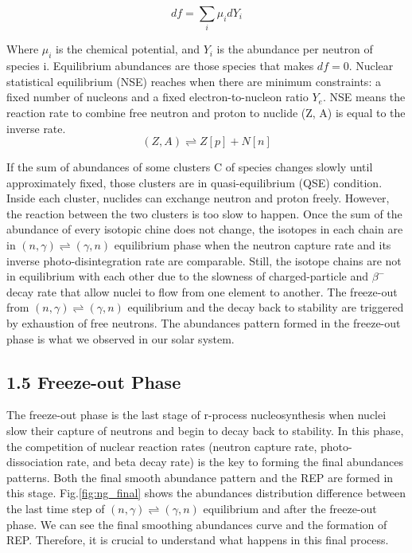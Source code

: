 \documentclass[aps,prl,preprint,groupedaddress]{revtex4}
\begin{document}
\begin{equation}
df = \sum_{i} \mu_idY_i
\end{equation}

Where $\mu_i$ is the chemical potential, and $Y_i$ is the abundance per neutron of species i. Equilibrium abundances are those species that makes $df = 0$. Nuclear statistical equilibrium (NSE) reaches when there are minimum constraints: a fixed number of nucleons and a fixed electron-to-nucleon ratio $Y_e$. NSE means the reaction rate to combine free neutron and proton to nuclide (Z, A) is equal to the inverse rate. 
\begin{equation}
    (Z,A) \rightleftharpoons Z[p] + N[n]
\end{equation}

If the sum of abundances of some clusters C of species changes slowly until approximately fixed, those clusters are in quasi-equilibrium (QSE) condition. Inside each cluster, nuclides can exchange neutron and proton freely. However, the reaction between the two clusters is too slow to happen.  Once the sum of the abundance of every isotopic chine does not change, the isotopes in each chain are in $(n, \gamma)\rightleftharpoons (\gamma, n)$ equilibrium phase when the neutron capture rate and its inverse photo-disintegration rate are comparable. Still, the isotope chains are not in equilibrium with each other due to the slowness of charged-particle and $\beta^-$ decay rate that allow nuclei to flow from one element to another. The freeze-out from $(n, \gamma)\rightleftharpoons (\gamma, n)$ equilibrium and the decay back to stability are triggered by exhaustion of free neutrons. The abundances pattern formed in the freeze-out phase is what we observed in our solar system. 

\subsection{1.5 Freeze-out Phase}
The freeze-out phase is the last stage of r-process nucleosynthesis when nuclei slow their capture of neutrons and begin to decay back to stability. In this phase, the competition of nuclear reaction rates (neutron capture rate, photo-dissociation rate, and beta decay rate) is the key to forming the final abundances patterns. Both the final smooth abundance pattern and the REP are formed in this stage. Fig.\ref{fig:ng_final} shows the abundances distribution difference between the last time step of $(n, \gamma)\rightleftharpoons (\gamma, n)$ equilibrium and after the freeze-out phase. We can see the final smoothing abundances curve and the formation of REP.  Therefore, it is crucial to understand what happens in this final process.\\
\end{document}
